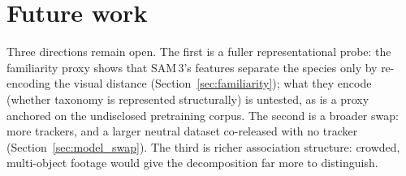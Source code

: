 \section{Future work}
\label{sec:concl-future}
Three directions remain open. The first is a fuller representational probe: the familiarity proxy shows that
SAM\,3's features separate the species only by re-encoding the visual distance
(Section~\ref{sec:familiarity}); what they encode (whether taxonomy is represented structurally) is
untested, as is a proxy anchored on the undisclosed pretraining corpus. The second is a broader swap: more
trackers, and a larger neutral dataset co-released with no tracker (Section~\ref{sec:model_swap}). The third is richer association structure: crowded, multi-object footage would give the decomposition far
more to distinguish.
